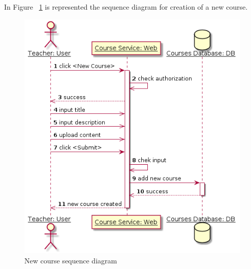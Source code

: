 \documentclass[12pt,a4paper,titlepage]{article}
\begin{document}
In Figure ~\ref{fig:create} is represented the sequence diagram for creation of a new course.
\begin{figure}[H]
	\includegraphics[width=\textwidth]{create}
	\caption{New course sequence diagram}
	\centering
	\label{fig:create}
\end{figure}
\end{document}
